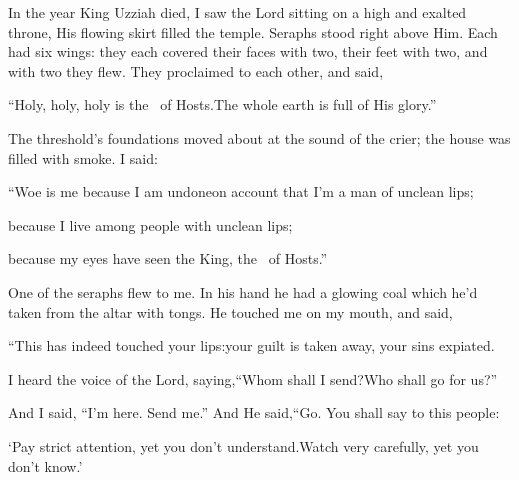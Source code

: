 
\begin{inparaenum}
   In the year King Uzziah died, I saw the Lord sitting on a high and exalted throne, His flowing skirt filled the temple.%
   Seraphs stood right above Him. Each had six wings: they each covered their faces with two, their feet with two, and with two they flew.%
   They proclaimed to each other, and said,\smallskip%

  \pc{}``Holy, holy, holy is the \lord\ of Hosts.\pa{}The whole earth is full of His glory.''\smallskip%

  \noindent{} The threshold's foundations moved about at the sound of the crier; the house was filled with smoke.%
   I said:\smallskip%

  \pc{}``Woe is me because I am undone\pa{}on account that I'm a man of unclean lips;%

  \pc{}because I live among people with unclean lips;%

  \pc{}because my eyes have seen the King, the \lord\ of Hosts.''\smallskip%

  \noindent{} One of the seraphs flew to me. In his hand he had a glowing coal which he'd taken from the altar with tongs.%
   He touched me on my mouth,%
  and said,\smallskip%

  \pc{}``This has indeed touched your lips:\pa{}your guilt is taken away, your sins expiated.%

  \pa{} I heard the voice of the Lord, saying,\pa{}``Whom shall I send?\pa{}Who shall go for us?''%

  \pa{}And I said, ``I'm here.%
  Send me.''\pa{} And He said,\pa{}``Go. You shall say to this people:%

  \pc{}`Pay strict attention, yet you don't understand.\pa{}Watch very carefully, yet you don't know.'%


\end{inparaenum}
